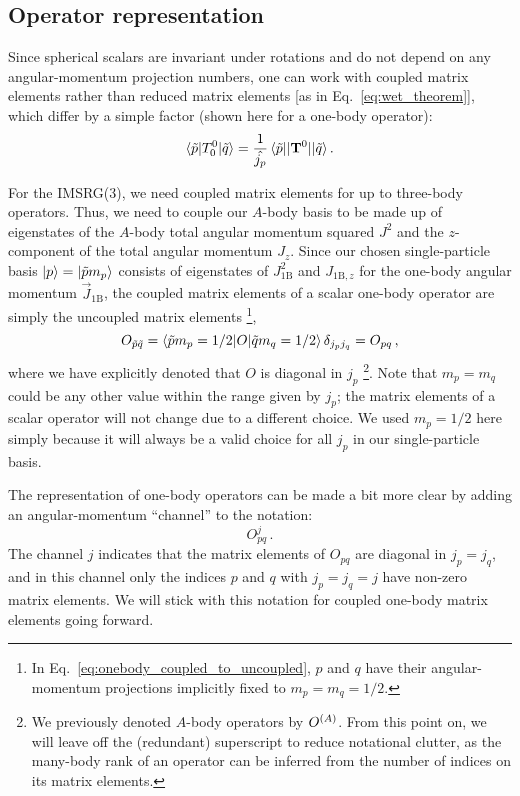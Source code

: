 \subsection{Operator representation}

Since spherical scalars are invariant under rotations
and do not depend on any angular-momentum projection numbers,
one can work with coupled matrix elements
rather than reduced matrix elements
  [as in Eq.~\eqref{eq:wet_theorem}],
which differ by a simple factor
(shown here for a one-body operator):
\begin{equation}
  \braket{\tilde{p} | T^{0}_{0} | \tilde{q}} =
  \frac{1}{\hat{j_p}}\braket{\tilde{p} || \mathbf{T}^{0} || \tilde{q}}.
\end{equation}

For the IMSRG(3), we need coupled matrix elements
for up to three-body operators.
Thus, we need to couple our $A$-body basis
to be made up of eigenstates of
the $A$-body total angular momentum squared $J^2$
and the $z$-component of the total angular momentum $J_{z}$.
Since our chosen single-particle basis $\ket{p} = \ket{\tilde{p}m_p}$
consists of eigenstates of $J_{\text{1B}}^2$ and $J_{\text{1B},z}$
for the one-body angular momentum $\vec{J}_{\text{1B}}$,
the coupled matrix elements of a scalar one-body operator
are simply the uncoupled matrix elements
\footnote{
  In Eq.~\eqref{eq:onebody_coupled_to_uncoupled},
  $p$ and $q$ have their angular-momentum projections
  implicitly fixed to $m_p=m_q=1/2$.
},
\begin{equation}
  O_{\tilde{p} \tilde{q}} = \braket{\tilde{p} m_p=1/2 | O | \tilde{q} m_q=1/2} \delta_{j_p j_q}
  = O_{pq}\,, \label{eq:onebody_coupled_to_uncoupled}
\end{equation}
where we have explicitly denoted that $O$ is diagonal in $j_p$
\footnote{We previously denoted $A$-body operators by ${O}^{(A)}$.
  From this point on, we will leave off the (redundant) superscript
  to reduce notational clutter,
  as the many-body rank of an operator
  can be inferred from the number of indices on its matrix elements.}.
Note that $m_p = m_q$ could be any other value
within the range given by $j_p$;
the matrix elements of a scalar operator will not change due to a different choice.
We used $m_p=1/2$ here simply because it will always be a valid choice
for all $j_p$ in our single-particle basis.

The representation of one-body operators can be made a bit more clear
by adding an angular-momentum ``channel'' to the notation:
\begin{equation}
  O^{j}_{pq}\,.
\end{equation}
The channel $j$ indicates that the matrix elements of $O_{pq}$
are diagonal in $j_p=j_q$,
and in this channel only the indices $p$ and $q$ with
$j_p = j_q = j$ have non-zero matrix elements.
We will stick with this notation
for coupled one-body matrix elements going forward.


